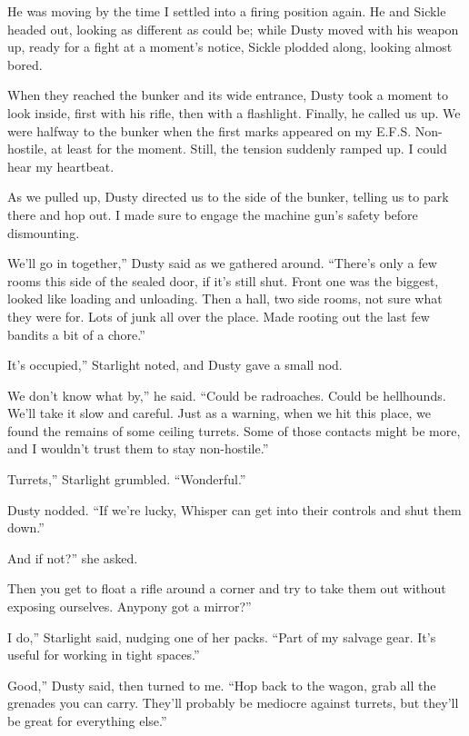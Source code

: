 He was moving by the time I settled into a firing position again. He and Sickle headed out, looking as different as could be; while Dusty moved with his weapon up, ready for a fight at a moment’s notice, Sickle plodded along, looking almost bored.

When they reached the bunker and its wide entrance, Dusty took a moment to look inside, first with his rifle, then with a flashlight. Finally, he called us up. We were halfway to the bunker when the first marks appeared on my E.F.S. Non-hostile, at least for the moment. Still, the tension suddenly ramped up. I could hear my heartbeat.

As we pulled up, Dusty directed us to the side of the bunker, telling us to park there and hop out. I made sure to engage the machine gun’s safety before dismounting.

\leavevmode{}We’ll go in together,” Dusty said as we gathered around. “There’s only a few rooms this side of the sealed door, if it’s still shut. Front one was the biggest, looked like loading and unloading. Then a hall, two side rooms, not sure what they were for. Lots of junk all over the place. Made rooting out the last few bandits a bit of a chore.”

\leavevmode{}It’s occupied,” Starlight noted, and Dusty gave a small nod.

\leavevmode{}We don’t know what by,” he said. “Could be radroaches. Could be hellhounds. We’ll take it slow and careful. Just as a warning, when we hit this place, we found the remains of some ceiling turrets. Some of those contacts might be more, and I wouldn’t trust them to stay non-hostile.”

\leavevmode{}Turrets,” Starlight grumbled. “Wonderful.”

Dusty nodded. “If we’re lucky, Whisper can get into their controls and shut them down.”

\leavevmode{}And if not?” she asked.

\leavevmode{}Then you get to float a rifle around a corner and try to take them out without exposing ourselves. Anypony got a mirror?”

\leavevmode{}I do,” Starlight said, nudging one of her packs. “Part of my salvage gear. It’s useful for working in tight spaces.”

\leavevmode{}Good,” Dusty said, then turned to me. “Hop back to the wagon, grab all the grenades you can carry. They’ll probably be mediocre against turrets, but they’ll be great for everything else.”

